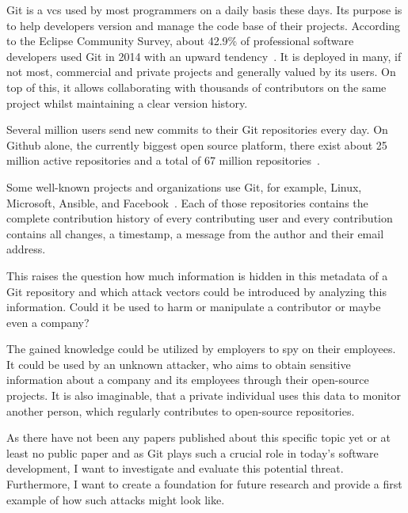Git is a \ac{vcs} used by most programmers on a daily basis these days.
Its purpose is to help developers version and manage the code base of their projects.
According to the Eclipse Community Survey, about 42.9\% of professional software developers used Git in 2014 with an upward tendency~\cite{article:git-popularity}.
It is deployed in many, if not most, commercial and private projects and generally valued by its users.
On top of this, it allows collaborating with thousands of contributors on the same project whilst maintaining a clear version history.

Several million users send new commits to their Git repositories every day.
On Github alone, the currently biggest open source platform, there exist about 25 million active repositories and a total of 67 million repositories~\cite{article:github-statistics}.

Some well-known projects and organizations use Git, for example, Linux, Microsoft, Ansible, and Facebook~\cite{article:github-statistics}.
Each of those repositories contains the complete contribution history of every contributing user and every contribution contains all changes, a timestamp, a message from the author and their email address.

This raises the question how much information is hidden in this metadata of a Git repository and which attack vectors could be introduced by analyzing this information.
Could it be used to harm or manipulate a contributor or maybe even a company?

The gained knowledge could be utilized by employers to spy on their employees.
It could be used by an unknown attacker, who aims to obtain sensitive information about a company and its employees through their open-source projects.
It is also imaginable, that a private individual uses this data to monitor another person, which regularly contributes to open-source repositories.

As there have not been any papers published about this specific topic yet or at least no public paper and as Git plays such a crucial role in today's software development, I want to investigate and evaluate this potential threat.
Furthermore, I want to create a foundation for future research and provide a first example of how such attacks might look like.

